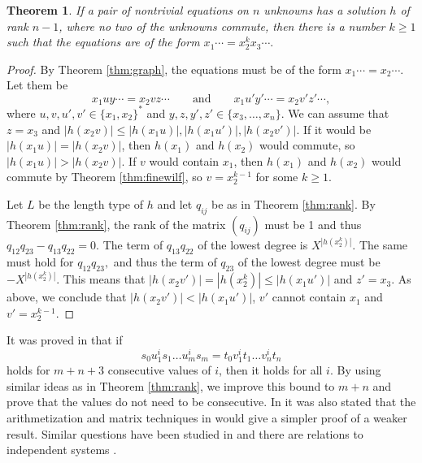 \documentclass[submission]{eptcs}
\newtheorem{theorem}{Theorem}[section]
\theoremstyle{definition}
\newcommand{\dd}{\cdots}
\begin{document}
\begin{theorem}
If a pair of nontrivial equations on $n$ unknowns has a solution $h$
of rank $n-1$, where no two of the unknowns commute, then there is a
number $k \geq 1$ such that the equations are of the form
\begin{math}
    x_1 \dd = x_2^k x_3 \dd .
\end{math}
\end{theorem}
\begin{proof}
By Theorem \ref{thm:graph}, the equations must be of the form $x_1
\dd = x_2 \dd$. Let them be
\begin{equation*}
    x_1 u y \dd = x_2 v z \dd
    \qquad \text{and} \qquad
    x_1 u' y' \dd = x_2 v' z' \dd,
\end{equation*}
where $u, v, u', v' \in \{x_1, x_2\}^*$ and $y, z, y', z' \in \{x_3,
\dots, x_n\}$. We can assume that $z = x_3$ and
\begin{math}
    |h(x_2 v)| \leq |h(x_1 u)|, |h(x_1 u')|, |h(x_2 v')|.
\end{math}
If it would be $|h(x_1 u)| = |h(x_2 v)|$, then $h(x_1)$ and $h(x_2)$
would commute, so $|h(x_1 u)| > |h(x_2 v)|$. If $v$ would contain
$x_1$, then $h(x_1)$ and $h(x_2)$ would commute by Theorem
\ref{thm:finewilf}, so $v = x_2^{k-1}$ for some $k \geq 1$.

Let $L$ be the length type of $h$ and let $q_{ij}$ be as in Theorem
\ref{thm:rank}. By Theorem \ref{thm:rank}, the rank of the matrix
$(q_{ij})$ must be 1 and thus
\begin{math}
    q_{12} q_{23} - q_{13} q_{22} = 0.
\end{math}
The term of
\begin{math}
    q_{13} q_{22}
\end{math}
of the lowest degree is $X^{|h(x_2^k)|}$. The same must hold for
\begin{math}
    q_{12} q_{23},
\end{math}
and thus the term of $q_{23}$ of the lowest degree must be
$-X^{|h(x_2^k)|}$. This means that $|h(x_2 v')| = |h(x_2^k)| \leq
|h(x_1 u')|$ and  $z' = x_3$. As above, we conclude that $|h(x_2
v')| < |h(x_1 u')|$, $v'$ cannot contain $x_1$ and $v' = x_2^{k-1}$.
\end{proof}

It was proved in \cite{Ko98} that if
\begin{equation*}
      s_0 u_1^i s_1 \dots u_m^i s_m
    = t_0 v_1^i t_1 \dots v_n^i t_n
\end{equation*}
holds for $m+n+3$ consecutive values of $i$, then it holds for all
$i$. By using similar ideas as in Theorem \ref{thm:rank}, we improve
this bound to $m+n$ and prove that the values do not need to be
consecutive. In \cite{Ko98} it was also stated that the
arithmetization and matrix techniques in \cite{Tu87} would give a
simpler proof of a weaker result. Similar questions have been
studied in \cite{HoKo07} and there are relations to independent
systems \cite{Pl03}.
\end{document}
